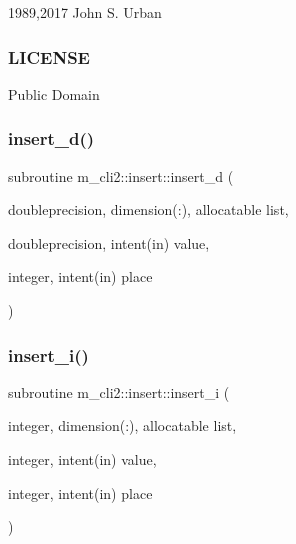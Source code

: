1989,2017 John S. Urban \subsubsection*{L\+I\+C\+E\+N\+SE}

Public Domain \mbox{\label{interfacem__cli2_1_1insert_afbcad9e7123fdec1b5c996adc6076a26}} 
\subsubsection{\texorpdfstring{insert\+\_\+d()}{insert\_d()}}
{\footnotesize\ttfamily subroutine m\+\_\+cli2\+::insert\+::insert\+\_\+d (\begin{DoxyParamCaption}\item[{doubleprecision, dimension(\+:), allocatable}]{list,  }\item[{doubleprecision, intent(in)}]{value,  }\item[{integer, intent(in)}]{place }\end{DoxyParamCaption})\hspace{0.3cm}{\ttfamily [private]}}

\mbox{\label{interfacem__cli2_1_1insert_a50fcaf89ea5907952b521845dd434835}} 
\subsubsection{\texorpdfstring{insert\+\_\+i()}{insert\_i()}}
{\footnotesize\ttfamily subroutine m\+\_\+cli2\+::insert\+::insert\+\_\+i (\begin{DoxyParamCaption}\item[{integer, dimension(\+:), allocatable}]{list,  }\item[{integer, intent(in)}]{value,  }\item[{integer, intent(in)}]{place }\end{DoxyParamCaption})\hspace{0.3cm}{\ttfamily [private]}}

\mbox{\label{interfacem__cli2_1_1insert_a48dedb7035fb157485c81de9fc245659}} 
